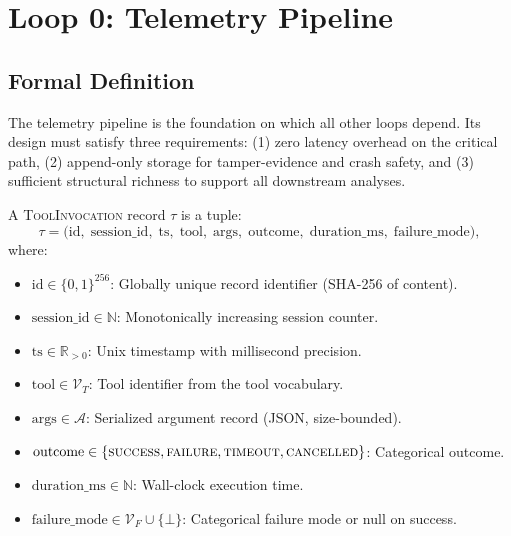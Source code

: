 \section{Loop 0: Telemetry Pipeline}

\label{sec:loop0}

\subsection{Formal Definition}

The telemetry pipeline is the foundation on which all other loops depend. Its
design must satisfy three requirements: (1) zero latency overhead on the
critical path, (2) append-only storage for tamper-evidence and crash safety,
and (3) sufficient structural richness to support all downstream analyses.

\begin{definition}
\label{def:tool_invocation}
A \textsc{ToolInvocation} record $\tau$ is a tuple:
\begin{equation}
\tau = \bigl( \text{id},\; \text{session\_id},\; \text{ts},\; \text{tool},\;
              \text{args},\; \text{outcome},\; \text{duration\_ms},\; \text{failure\_mode} \bigr),
\end{equation}
where:
\begin{itemize}[leftmargin=1.5em, nosep]
    \item $\text{id} \in \{0,1\}^{256}$: Globally unique record identifier (SHA-256 of content).
    \item $\text{session\_id} \in \mathbb{N}$: Monotonically increasing session counter.
    \item $\text{ts} \in \mathbb{R}_{>0}$: Unix timestamp with millisecond precision.
    \item $\text{tool} \in \mathcal{V}_T$: Tool identifier from the tool vocabulary.
    \item $\text{args} \in \mathcal{A}$: Serialized argument record (JSON, size-bounded).
    \item $\text{outcome} \in \{\textsc{success}, \textsc{failure}, \textsc{timeout}, \textsc{cancelled}\}$: Categorical outcome.
    \item $\text{duration\_ms} \in \mathbb{N}$: Wall-clock execution time.
    \item $\text{failure\_mode} \in \mathcal{V}_F \cup \{\bot\}$: Categorical failure mode or null on success.
\end{itemize}
\end{definition}

